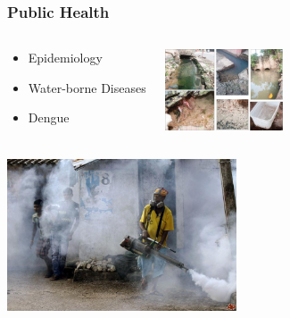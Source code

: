 \documentclass[serif,mathserif]{beamer}
\begin{document}
\begin{frame}
  \frametitle{Public Health}
\begin{columns}
\begin{center}
\begin{itemize}
 \item Epidemiology
 \item Water-borne Diseases
 \item Dengue
\end{itemize}
\end{center}

\begin{center}
 \includegraphics[width=3.5cm]{12-dengue}
\end{center}
\end{columns}
\vspace{2mm}
\begin{flushleft}
 \hspace{2.5mm}
 \includegraphics[height=4.5cm]{sri-lanka-dengue-2011-6-17-10-33-1}
\end{flushleft}
\end{frame}
\end{document}
